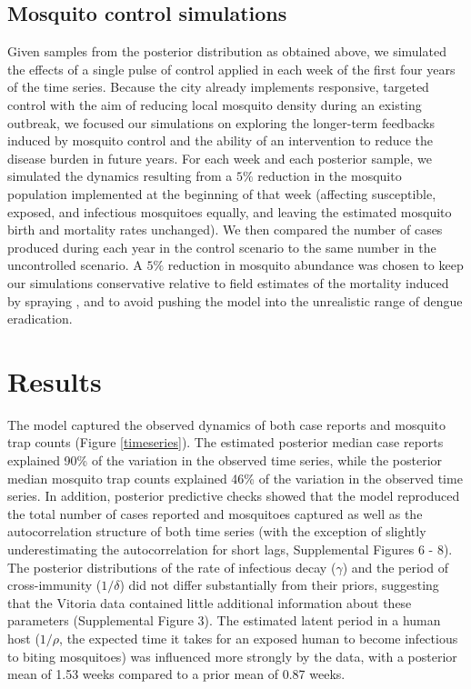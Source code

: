 \documentclass[10pt,letterpaper]{article}
\begin{document}
\subsection*{Mosquito control simulations}

Given samples from the posterior distribution as obtained above, we simulated the effects of a single pulse of control applied in each week of the first four years of the time series.
Because the city already implements responsive, targeted control with the aim of reducing local mosquito density during an existing outbreak, we focused our simulations on exploring the longer-term feedbacks induced by mosquito control and the ability of an intervention to reduce the disease burden in future years.
For each week and each posterior sample, we simulated the dynamics resulting from a $5\%$ reduction in the mosquito population implemented at the beginning of that week (affecting susceptible, exposed, and infectious mosquitoes equally, and leaving the estimated mosquito birth and mortality rates unchanged).
We then compared the number of cases produced during each year in the control scenario to the same number in the uncontrolled scenario.
A $5\%$ reduction in mosquito abundance was chosen to keep our simulations conservative relative to field estimates of the mortality induced by spraying \cite{Esu2010}, and to avoid pushing the model into the unrealistic range of dengue eradication.

\section*{Results}

The model captured the observed dynamics of both case reports and mosquito trap counts (Figure \ref{timeseries}).
The estimated posterior median case reports explained 90\% of the variation in the observed time series, while the posterior median mosquito trap counts explained 46\% of the variation in the observed time series. 
In addition, posterior predictive checks showed that the model reproduced the total number of cases reported and mosquitoes captured as well as the autocorrelation structure of both time series (with the exception of slightly underestimating the autocorrelation for short lags, Supplemental Figures 6 - 8).
The posterior distributions of the rate of infectious decay ($\gamma$) and the period of cross-immunity ($1/\delta$) did not differ substantially from their priors, suggesting that the Vitoria data contained little additional information about these parameters (Supplemental Figure 3).
The estimated latent period in a human host ($1/\rho$, the expected time it takes for an exposed human to become infectious to biting mosquitoes) was influenced more strongly by the data, with a posterior mean of 1.53 weeks compared to a prior mean of 0.87 weeks.
\end{document}

